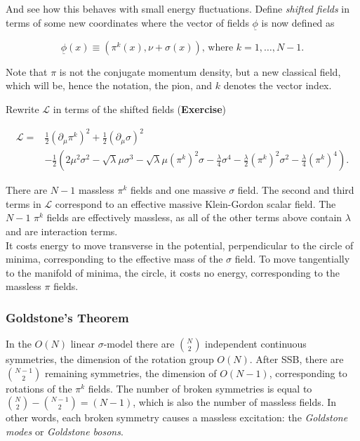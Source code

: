 \noindent And see how this behaves with small energy fluctuations. Define \textit{shifted fields} in terms of some new coordinates where the vector of fields $\underline{\phi}$ is now defined as

\begin{equation}
\underline{\phi} (x) \equiv ( \pi^k (x), \nu + \sigma (x) ) \text{, where } k = 1, \dots , N-1.
\end{equation}

\noindent Note that $\pi$ is not the conjugate momentum density, but a new classical field, which will be, hence the notation, the pion, and $k$ denotes the vector index.

\noindent Rewrite $\mathcal{L}$ in terms of the shifted fields (\textbf{Exercise})

\begin{align}
\mathcal{L} = &\frac{1}{2} (\partial_\mu \pi^k)^2 + \frac{1}{2} (\partial_\mu \sigma)^2 \\
& - \frac{1}{2} \left( 2 \mu^2 \sigma^2 - \sqrt{\lambda} \mu \sigma^3 - \sqrt{\lambda} \mu (\pi^k)^2 \sigma - \frac{\lambda}{4} \sigma^4 - \frac{\lambda}{2} (\pi^k)^2 \sigma^2 - \frac{\lambda}{4} (\pi^k)^4 \right).
\end{align}

\noindent There are $N-1$ massless $\pi^k$ fields and one massive $\sigma$ field. The second and third terms in $\mathcal{L}$ correspond to an effective massive Klein-Gordon scalar field. The $N-1$ $\pi^k$ fields are effectively massless, as all of the other terms above contain $\lambda$ and are interaction terms. \\

\noindent It costs energy to move transverse in the potential, perpendicular to the circle of minima, corresponding to the effective mass of the $\sigma$ field. To move tangentially to the manifold of minima, the circle, it costs no energy, corresponding to the massless $\pi$ fields. \\

\subsubsection*{Goldstone's Theorem}

\noindent In the $O(N)$ linear $\sigma$-model there are ${N \choose 2}$ independent continuous symmetries, the dimension of the rotation group $O(N)$. After SSB, there are ${N-1 \choose 2}$ remaining symmetries, the dimension of $O(N-1)$, corresponding to rotations of the $\pi^k$ fields. The number of broken symmetries is equal to ${N \choose 2} - {N-1 \choose 2} = (N-1)$, which is also the number of massless fields. In other words, each broken symmetry causes a massless excitation: the \textit{Goldstone modes} or \textit{Goldstone bosons}. \\

